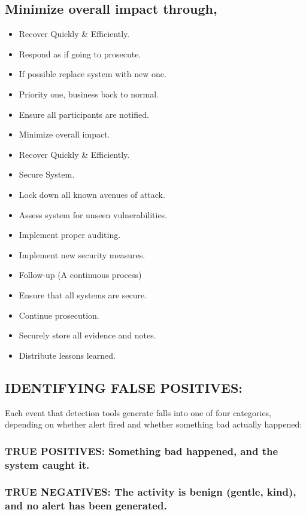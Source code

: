 \documentclass[10pt,british,english]{article}
\begin{document}
\subsection{Minimize overall impact through,}
\begin{itemize}
\item Recover Quickly \& Efficiently.
\item Respond as if going to prosecute.
\item If possible replace system with new one.
\item Priority one, business back to normal.
\item Ensure all participants are notified.
\item Minimize overall impact.
\item Recover Quickly \& Efficiently.
\item Secure System.
\item Lock down all known avenues of attack.
\item Assess system for unseen vulnerabilities.
\item Implement proper auditing.
\item Implement new security measures. 
\item Follow-up (A continuous process)
\item Ensure that all systems are secure.
\item Continue prosecution.
\item Securely store all evidence and notes.
\item Distribute lessons learned.
\end{itemize}

\subsection{IDENTIFYING FALSE POSITIVES:}

Each event that detection tools generate falls into one of four categories,
depending on whether alert fired and whether something bad actually
happened:

\subsubsection{TRUE POSITIVES: Something bad happened, and the system caught it.}

\subsubsection{TRUE NEGATIVES: The activity is benign (gentle, kind), and no alert
has been generated.}
\end{document}
